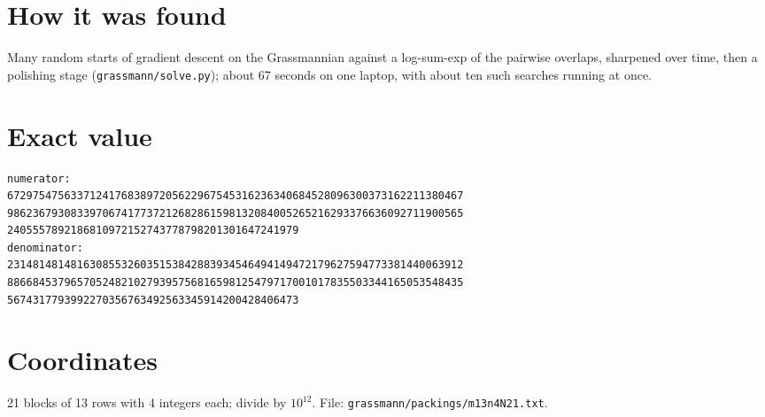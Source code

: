 \documentclass[11pt,a4paper]{article}
\begin{document}
\section{How it was found}
Many random starts of gradient descent on the Grassmannian against a log-sum-exp of the pairwise overlaps, sharpened over time, then a polishing stage (\texttt{grassmann/solve.py}); about 67 seconds on one laptop, with about ten such searches running at once.


\appendix
\section{Exact value}
{\small
\begin{verbatim}
numerator:
672975475633712417683897205622967545316236340684528096300373162211380467
986236793083397067417737212682861598132084005265216293376636092711900565
2405557892186810972152743778798201301647241979
denominator:
231481481481630855326035153842883934546494149472179627594773381440063912
886684537965705248210279395756816598125479717001017835503344165053548435
5674317793992270356763492563345914200428406473
\end{verbatim}}

\section{Coordinates}
21 blocks of 13 rows with 4 integers each; divide by $10^{12}$. File: \texttt{grassmann/packings/m13n4N21.txt}.
{\tiny
\begin{multicols}{3}
\end{multicols}}
\end{document}
